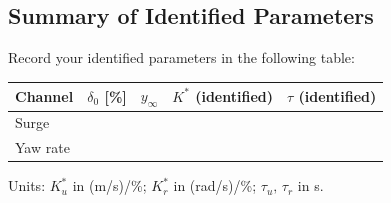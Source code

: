 \documentclass[11pt]{article}
\begin{document}
\subsection{Summary of Identified Parameters}

Record your identified parameters in the following table:

\vspace{6pt}
\begin{center}
\begin{tabular}{C{2.2cm} C{2.2cm} C{2.2cm} C{2.2cm} C{2.2cm}}
  \textbf{Channel} & \textbf{$\delta_0$ [\%]} & \textbf{$y_\infty$} &
  \textbf{$K^*$ (identified)} & \textbf{$\tau$ (identified)} \\
  \midrule
  Surge & & & & \\[8pt]
  Yaw rate & & & & \\[8pt]
  \bottomrule
\end{tabular}
\end{center}
\vspace{6pt}

\noindent Units: $K_u^*$ in (m/s)/\%;\; $K_r^*$ in (rad/s)/\%;\;
$\tau_u,\,\tau_r$ in s.
\end{document}
